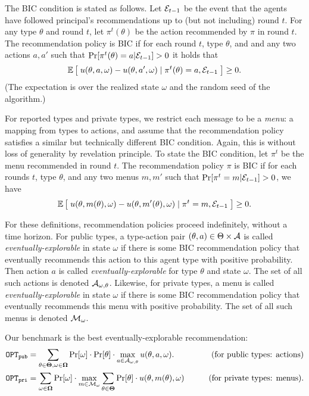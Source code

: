The BIC condition is stated as follows. Let $\mathcal{E}_{t-1}$ be the event that the agents have followed principal's recommendations up to (but not including) round $t$. For any type $\theta$ and round $t$, let $\pi^t(\theta)$ be the action recommended by $\pi$ in round $t$. The recommendation policy is BIC if for each round $t$, type $\theta$, and and any two actions $a,a'$ such that $\Pr[\pi^t(\theta) = a|\mathcal{E}_{t-1}] > 0$ it holds that
\begin{align}\label{eq:model-BIC-actions}
\mathbb{E}\left[\; u(\theta,a,\omega) - u(\theta,a',\omega) \mid \pi^t(\theta) =a, \mathcal{E}_{t-1}\;\right] \geq 0.
\end{align}
(The expectation is over the realized state $\omega$ and the random seed of the algorithm.)

For reported types and private types, we restrict each message to be a \emph{menu}: a mapping from types to actions, and assume that the recommendation policy satisfies a similar but technically different BIC condition. Again, this is without loss of generality by revelation principle. To state the BIC condition, let $\pi^t$ be the menu recommended in round $t$. The recommendation policy $\pi$ is BIC if for each rounds $t$, type $\theta$, and any two menus $m,m'$ such that
    $\Pr[\pi^t= m|\mathcal{E}_{t-1}] > 0$, we have
\begin{align}\label{eq:model-BIC-menus}
\mathbb{E}\left[\; u(\theta,m(\theta),\omega) - u(\theta,m'(\theta),\omega)
    \mid \pi^t = m, \mathcal{E}_{t-1}\;\right] \geq 0.
\end{align}

For these definitions, recommendation policies proceed indefinitely, \ie without a time horizon. For public types, a type-action pair $(\theta,a)\in \Theta\times \mathcal{A}$ is called \emph{eventually-explorable} in state $\omega$ if there is some BIC recommendation policy that eventually recommends this action to this agent type with positive probability. Then action $a$ is called \emph{eventually-explorable} for type $\theta$ and state $\omega$. The set of all such actions is denoted $\mathcal{A}_{\omega,\theta}$. Likewise, for private types, a menu is called \emph{eventually-explorable} in state $\omega$ if there is some BIC recommendation policy that eventually recommends this menu with positive probability. The set of all such menus is denoted $\mathcal{M}_{\omega}$.

Our benchmark is the best eventually-explorable recommendation:
\begin{align*}
\mathtt{OPT}_{\mathtt{pub}} &= \sum_{\theta \in \bold{\Theta}, \omega\in \bold{\Omega}} \Pr[\omega] \cdot \Pr[\theta] \cdot \max_{a \in \mathcal{A}_{\omega,\theta}} u(\theta, a, \omega).
    &\qquad\text{(for public types: actions)}\\
\mathtt{OPT}_{\mathtt{pri}} &= \sum_{\omega\in \bold{\Omega}} \Pr[\omega] \cdot\max_{m \in \mathcal{M}_{\omega}}\sum_{\theta \in \bold{\Theta}} \Pr[\theta] \cdot  u(\theta, m(\theta), \omega)
&\qquad\text{(for private types: menus)}.
\end{align*}

